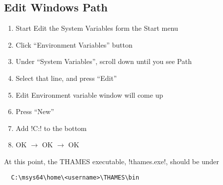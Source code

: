 \documentclass{article}
\begin{document}
\subsection{Edit Windows Path}
\begin{enumerate}
  \item Start Edit the System Variables form the Start menu
  \item Click ``Environment Variables'' button
  \item Under ``System Variables'', scroll down until you see Path
  \item Select that line, and press ``Edit''
  \item Edit Environment variable window will come up
  \item Press ``New''
  \item Add !C:\bin! to the bottom
  \item OK $\longrightarrow$ OK $\longrightarrow$ OK
\end{enumerate}
 
At this point, the THAMES executable, !thames.exe!,
should be under

\begin{Verbatim}
  C:\msys64\home\<username>\THAMES\bin
\end{Verbatim}
 
\end{document}
